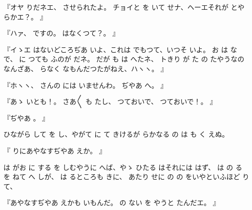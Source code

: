 『オヤ
りだネエ、
させられたよ。
チョイと
を
いて
せナ、ヘーエそれが
とやらかエ？。
』

『ハァ、
ですの。
はなくつて？。
』

『イゝエ
はないどころぢあ
いよ、これは
でもつて、いつそ
いよ。
お
は
な
で、
に
つても
ふのが
だネ。
だが
も
は
へたネ、
トきり
が
た
の
たやうなのなんざあ、
らなく
なもんだつたがねえ、ハヽヽ。
』

『ホヽヽ、
さんの
には
いませんわ。
ぢやあ
へ。
』

『あゝ
いとも！。
さあ〳〵
も
たし、
つておいで、
つておいで！。
』

『ぢやあ
。
』

ひながら
して
を
し、やがて
に
て
きけるが
らかなる
の
は
も
く
えぬ。

『
りにあやなすぢやあ
えか。
』

は
がお
に
する
を
しむやうに
へば、やゝ
ひたる
はそれには
はず、
は
の
る
を
ねて
へ
しが、
は
るところも
きに、
あたり
せに
の
の
をいやといふほど
りて、

『あやなすぢやあ
えかも
いもんだ。
の
ない
を
やうと
たんだエ。
』

